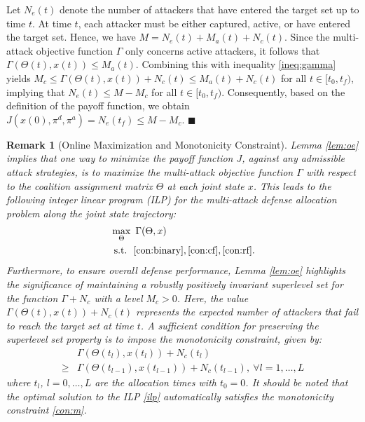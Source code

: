\documentclass[journal]{IEEEtran}
\newtheorem{Remark}{\bf Remark}
\newenvironment{Proof}{\noindent{\em Proof:\/}}{\hfill $\blacksquare$\par}
\newcommand{\1}{\mathbf{1}}
\begin{document}
\begin{Proof}
Let $N_e(t)$ denote the number of attackers that have entered the target set up to time $t$. At time $t$, each attacker must be either captured, active, or have entered the target set. Hence, we have $M=N_e(t)+M_a(t)+N_c(t)$. Since the multi-attack objective function $\Gamma$ only concerns active attackers, it follows that $\Gamma(\Theta(t),x(t))\leq M_a(t)$. Combining this with inequality \eqref{ineq:gamma} yields $M_c\leq\Gamma(\Theta(t),x(t))+N_c(t)\leq M_a(t)+N_c(t)$ for all $t\in [t_0,t_f)$, implying that $N_e(t)\leq M-M_c$ for all $t\in [t_0,t_f)$. Consequently, based on the definition of the payoff function, we obtain $J(x(0),\pi^d,\pi^a)=N_e(t_f)\leq M-M_c$.
\end{Proof}

\begin{Remark}[Online Maximization and Monotonicity Constraint]
Lemma \ref{lem:oe} implies that one way to minimize the payoff function $J$, against any admissible attack strategies, is to maximize the multi-attack objective function $\Gamma$ with respect to the coalition assignment matrix $\Theta$ at each joint state $x$. This leads to the following integer linear program (ILP) for the multi-attack defense allocation problem along the joint state trajectory:
\begin{equation}\label{ilp}
    \begin{split}
	    &\max_{\Theta}~\Gamma(\Theta,x)\\
	    &~\mathrm{s.t.}~~\eqref{con:binary},\eqref{con:cf},\eqref{con:rf}.
    \end{split}
\end{equation}
Furthermore, to ensure overall defense performance, Lemma \ref{lem:oe} highlights the significance of maintaining a robustly positively invariant superlevel set for the function $\Gamma + N_c$ with a level $M_c > 0$. Here, the value $\Gamma(\Theta(t),x(t))+N_c(t)$ represents the expected number of attackers that fail to reach the target set at time $t$. A sufficient condition for preserving the superlevel set property is to impose the monotonicity constraint, given by:
\begin{equation}\label{con:m}
    \begin{split}
        &\Gamma(\Theta(t_l),x(t_l))+N_c(t_l)\\
        \geq&\Gamma(\Theta(t_{l-1}),x(t_{l-1}))+N_c(t_{l-1}),~\forall l=1,\ldots,L
    \end{split}
\end{equation}
where $t_l$, $l=0,\ldots,L$ are the allocation times with $t_0=0$. It should be noted that the optimal solution to the ILP \eqref{ilp} automatically satisfies the monotonicity constraint \eqref{con:m}.
\end{Remark}
\end{document}
